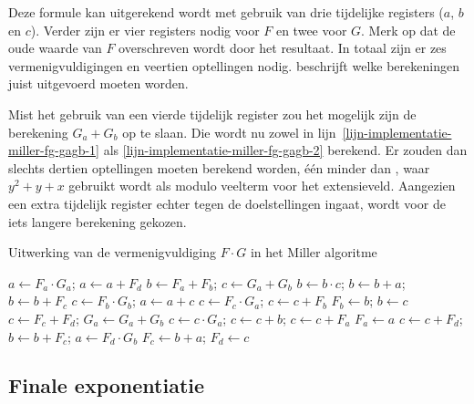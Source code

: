 Deze formule kan uitgerekend wordt met gebruik van drie tijdelijke registers ($a$, $b$ en $c$). Verder zijn er vier registers nodig voor $F$ en twee voor $G$. Merk op dat de oude waarde van $F$ overschreven wordt door het resultaat. In totaal zijn er zes vermenigvuldigingen en veertien optellingen nodig.  beschrijft welke berekeningen juist uitgevoerd moeten worden.

Mist het gebruik van een vierde tijdelijk register zou het mogelijk zijn de berekening $G_a + G_b$ op te slaan. Die wordt nu zowel in lijn~\ref{lijn-implementatie-miller-fg-gagb-1} als \ref{lijn-implementatie-miller-fg-gagb-2} berekend. Er zouden dan slechts dertien optellingen moeten berekend worden, \'e\'en minder dan \cite{beuchat}, waar $y^2 + y +x$ gebruikt wordt als modulo veelterm voor het extensieveld. Aangezien een extra tijdelijk register echter tegen de doelstellingen ingaat, wordt voor de iets langere berekening gekozen.

\begin{algorithm}[h]
	\caption{Uitwerking van de vermenigvuldiging $F \cdot G$ in het Miller algoritme}
	\label{algoritme-implementatie-miller-fg}
	$a \leftarrow F_a \cdot G_a$; $a \leftarrow a + F_d$\;
	$b \leftarrow F_a + F_b$; $c \leftarrow G_a + G_b$\;
	$b \leftarrow b \cdot c$; $b \leftarrow b + a$; $b \leftarrow b + F_c$\;
	$c \leftarrow F_b \cdot G_b$; $a \leftarrow a + c$\;
	$c \leftarrow F_c \cdot G_a$;	$c \leftarrow c + F_b$\;
	$F_b \leftarrow b$; $b \leftarrow c$\;
	$c \leftarrow F_c + F_d$; $G_a \leftarrow G_a + G_b$\;
	$c \leftarrow c \cdot G_a$; $c \leftarrow c + b$; $c \leftarrow c + F_a$\;
	$F_a \leftarrow a$\;
	$c \leftarrow c + F_d$; $b \leftarrow b + F_c$; $a \leftarrow F_d \cdot G_b$\;
	$F_c \leftarrow b + a$; $F_d \leftarrow c$\;
\end{algorithm}

\subsection{Finale exponentiatie}\label{subsectie-implementatie-miller-finale-exp}

